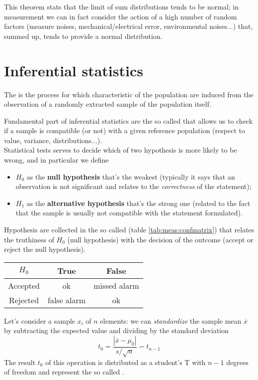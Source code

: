 	This theorem stats that the limit of sum distributions tends to be normal; in measurement we can in fact consider the action of a high number of random factors (measure noises, mechanical/electrical error, environmental noises...) that, summed up, tends to provide a normal distribution.
	
\section{Inferential statistics}
	The  is the process for which characteristic of the population are induced from the observation of a randomly extracted sample of the population itself.
	
	Fundamental part of inferential statistics are the so called  that allows us to check if a sample is compatible (or not) with a given reference population (respect to value, variance, distributions...).\\
	Statistical tests serves to decide which of two hypothesis is more likely to be wrong,  and in particular we define
	\begin{itemize}
		\item $H_0$ as the \textbf{null hypothesis} that's the weakest (typically it says that an observation is not significant and relates to the \textit{correctness} of the statement);
		\item $H_1$ as the \textbf{alternative hypothesis} that's the strong one (related to the fact that the sample is usually not compatible with the statement formulated).
	\end{itemize}
	
	Hypothesis are collected in the so called  (table \ref{tab:meas:confmatrix}) that relates the truthiness of $H_0$ (null hypothesis) with the decision of the outcome  (accept or reject the null hypothesis).
	
	\begin{SCtable}[0.8][bht]
		\begin{tabular}{c|c c}
			$H_0$ & True & False \\ \hline 
			Accepted & ok & missed alarm \\
			Rejected & false alarm  & ok
		\end{tabular}
		\caption{confusion matrix.} \label{tab:meas:confmatrix}
	\end{SCtable}
		
	Let's consider a sample $x_i$ of $n$ elements: we can \textit{standardize} the sample mean $\overline x$ by subtracting the expected value and dividing by the standard deviation
	\begin{equation} \label{eq:studenttest}
		t_0 = \frac{|\overline x - \mu_0|}{s/\sqrt n} \backsim t_{n-1}
	\end{equation}
	The result $t_0$ of this operation is distributed as a student's T with $n-1$ degrees of freedom and represent the so called .
	
